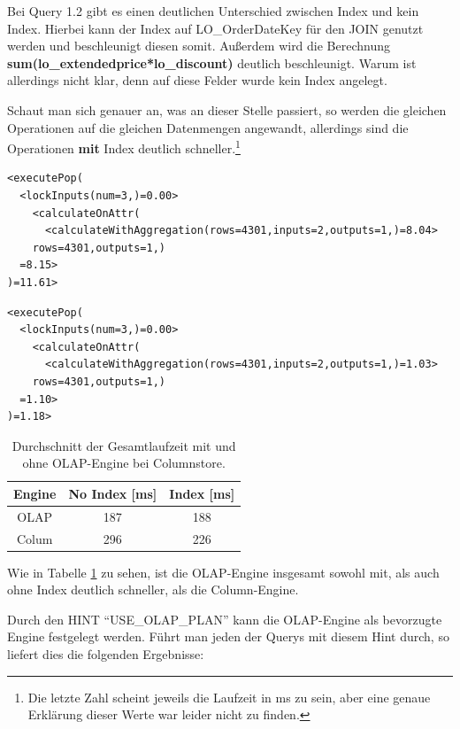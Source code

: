 Bei Query 1.2 gibt es einen deutlichen Unterschied zwischen Index und kein Index. Hierbei kann der Index auf LO\_OrderDateKey für den JOIN genutzt werden und beschleunigt diesen somit.
Außerdem wird die Berechnung \textbf{sum(lo\_extendedprice*lo\_discount)} deutlich beschleunigt. Warum ist allerdings nicht klar, denn auf diese Felder wurde kein Index angelegt.


Schaut man sich genauer an, was an dieser Stelle passiert, so werden die gleichen Operationen auf die gleichen Datenmengen angewandt, allerdings sind die Operationen \textbf{mit} Index deutlich schneller.\footnote{Die letzte Zahl scheint jeweils die Laufzeit in ms zu sein, aber eine genaue Erklärung dieser Werte war leider nicht zu finden.}
\begin{lstlisting}[breaklines, caption=Ohne Index]
<executePop(
  <lockInputs(num=3,)=0.00>
    <calculateOnAttr(
      <calculateWithAggregation(rows=4301,inputs=2,outputs=1,)=8.04>
    rows=4301,outputs=1,)
  =8.15>
)=11.61>
\end{lstlisting}

\begin{lstlisting}[breaklines, caption=Mit Index]
<executePop(
  <lockInputs(num=3,)=0.00>
    <calculateOnAttr(
      <calculateWithAggregation(rows=4301,inputs=2,outputs=1,)=1.03>
    rows=4301,outputs=1,)
  =1.10>
)=1.18>
\end{lstlisting}

\iffalse
\setlength\intextsep{0pt}
\begin{table}
    \begin{tabular}{ccc}
        \toprule
        Engine              & No Index [ms]   & Index [ms] \\
        \toprule
        OLAP                & 187        & 188            \\
        Colum               & 296        & 226            \\   
        \bottomrule
    \end{tabular}
	\caption{Durchschnitt der Gesamtlaufzeit mit und ohne OLAP-Engine bei Columnstore.}
    \label{tab:olap}
\end{table}



Wie in Tabelle \ref{tab:olap} zu sehen, ist die OLAP-Engine insgesamt sowohl mit, als auch ohne Index deutlich schneller, als die Column-Engine. 

Durch den HINT \enquote{USE\_OLAP\_PLAN} kann die OLAP-Engine als bevorzugte Engine festgelegt werden. Führt man jeden der Querys mit diesem Hint durch, so liefert dies die folgenden Ergebnisse:


